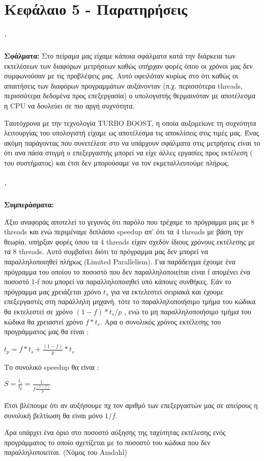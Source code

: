 \documentclass[greek,booktabs,8pt,flagBlueCMYK]{report}
\begin{document}
\chapter{Κεφάλαιο 5 - Παρατηρήσεις}
\paragraph{.} \textbf{Σφάλματα:}\newline
\FloatBarrier
Στο πείραμα μας είχαμε κάποια σφάλματα κατά την διάρκεια των εκτελέσεων των διαφόρων μετρήσεων καθώς υπήρχαν φορές όπου οι χρόνοι μας δεν
συμφωνούσαν με τις προβλέψεις μας. Αυτό οφειλόταν κυρίως στο ότι καθώς οι απαιτήσεις των διαφόρων προγραμμάτων αυξάνονταν (π.χ. περισσότερα threads, περισσότερα δεδομένα προς επεξεργασία) ο υπολογιστής θερμαινόταν με αποτέλεσμα η CPU να δουλεύει σε πιο αργή συχνότητα.

Ταυτόχρονα με την τεχνολογία TURBO BOOST, η οποία αυξομείωνε τη συχνότητα λειτουργίας του υπολογιστή είχαμε ως
αποτέλεσμα τις αποκλίσεις στις τιμές μας. Ένας ακόμη παράγοντας που συνετέλεσε στο να υπάρχουν σφάλματα στις μετρήσεις είναι το ότι ανα
πάσα στιγμή ο επεξεργαστής μπορεί να είχε άλλες εργασίες προς εκτέλεση ( του συστήματος) και έτσι δεν μπορούσαμε να τον
εκμεταλλευτούμε πλήρως. 

\paragraph{.} \textbf{Συμπεράσματα:}\newline

Άξιο αναφοράς αποτελεί το γεγονός ότι παρόλο που τρέχαμε το πρόγραμμα μας με 8 threads και ενώ περιμέναμε διπλάσιο speedup απ'
ότι τα 4 threads με βάση την θεωρία, υπήρξαν φορές όπου τα 4 threads είχαν σχεδόν ίδιους χρόνους εκτέλεσης με τα 8 threads.
Αυτό συμβαίνει διότι το πρόγραμμα μας δεν μπορεί να παραλληλοποιηθεί πλήρως (Limited Parallelism). Για παράδειγμα έχουμε ένα πρόγραμμα
του οποίου το ποσοστό που δεν παραλληλοποιείται είναι f απομένει ένα ποσοστό 1-f που μπορεί να παραλληλοποιηθεί υπό κάποιες συνθήκες. Εάν το πρόγραμμα μας χρειάζεται χρόνο $t_{s}$ για να εκτελεστεί σειριακά και έχουμε επεξεργαστές στη παράλληλη μηχανή, τότε το
παραλληλοποιήσιμο τμήμα του κώδικα θα εκτελεστεί σε χρόνο $(1-f)*t_{s}/p$ , ενώ το μη παραλληλοποιήσιμο τμήμα του κώδικα θα
χρειαστεί χρόνο $f*t_{s}$. Aρα ο συνολικός χρόνος εκτέλεσης του προγράμματος μας θα είναι :
\\
\begin{center}
  $ t_{p} = f * t_{s} + \frac{(1-f)}{p}*t_{s} $
\end{center}
Το συνολικό speedup θα είναι : \\
\begin{center}
$ S = \frac{t_{s}}{t_{p}} = \frac{1}{f \frac{(1-f)}{p}}$
\end{center}

Έτσι βλέπουμε ότι αν αυξήσουμε πχ τον αριθμό των επεξεργαστών μας σε απείρους η συνολική βελτίωση θα
είναι μόνο $ 1/f $.

\FloatBarrier
Άρα υπάρχει ένα όριο στο ποσοστό αύξησης της ταχύτητας εκτέλεσης ενός προγράμματος το οποίο σχετίζεται με το ποσοστό του κώδικα που
δεν παραλληλοποιείται. (Νόμος του Amdahl)
\end{document}

